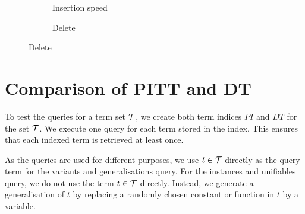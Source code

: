 \begin{figure}[h]
  \begin{subfigure}{0.45\textwidth}
\begin{adjustbox}{width=1\textwidth}
\end{adjustbox}
\caption{Insertion speed}
\label{TODOGraph}
\end{subfigure}
\begin{subfigure}{0.1\textwidth}
\end{subfigure}
\begin{subfigure}{0.45\textwidth}
\begin{adjustbox}{width=1\textwidth}
\end{adjustbox}
\caption{Delete}
\label{TODOGraph}
\end{subfigure}
\end{figure}

\section{Comparison of PITT and DT}
To test the queries for a term set $\mathcal{T}$, we create both term indices $PI$ and $DT$ for the set $\mathcal{T}$. We execute one query for each term stored in the index. This ensures that each indexed term is retrieved at least once.

As the queries are used for different purposes, we use $t \in \mathcal{T}$ directly as the query term for the variants and generalisations query.
For the instances and unifiables query, we do not use the term $t \in \mathcal{T}$ directly.
Instead, we generate a generalisation of $t$ by replacing a randomly chosen constant or function in $t$ by a variable.

